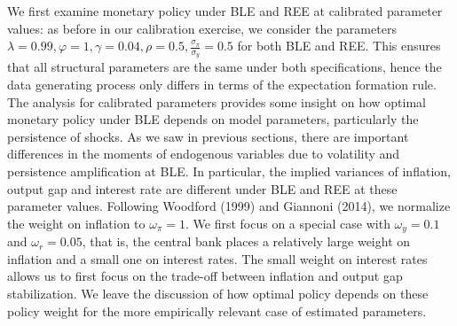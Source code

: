         We first examine monetary policy under BLE and REE at calibrated parameter values: as before in our calibration exercise, we consider the parameters $\lambda=0.99, \varphi=1, \gamma=0.04, \rho=0.5, \frac{\sigma_{\pi}}{\sigma_y}=0.5$ for both BLE and REE. This ensures that all structural parameters are the same under both specifications, hence the data generating process only differs in terms of the expectation formation rule. The analysis for calibrated parameters provides some insight on how optimal monetary policy under BLE depends on model parameters, particularly the persistence of shocks. As we saw in previous sections, there are important differences in the moments of endogenous variables due to volatility and persistence amplification at BLE. In particular, the implied variances of inflation, output gap and interest rate are different under BLE and REE at these parameter values. Following Woodford (1999) and Giannoni (2014), we normalize the weight on inflation to $\omega_{\pi}=1$. 
        We first focus on a special case with $\omega_y=0.1$ and $\omega_r=0.05$, that is, the central bank places a relatively large weight on inflation and a small one on interest rates. The small weight on interest rates allows us to first focus on the trade-off between inflation and output gap stabilization. We leave the discussion of how optimal policy depends on these policy weight for the more empirically relevant case of estimated parameters. 


